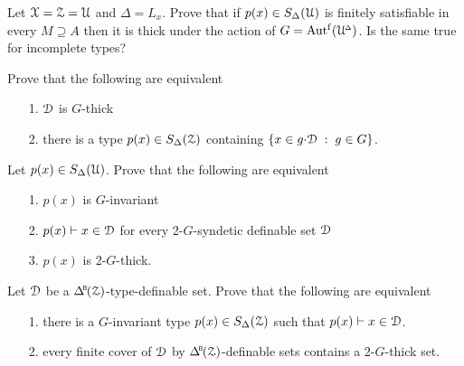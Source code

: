 
\begin{exercise}
  Let $\EuScript X=\EuScript Z=\EuScript U$ and $\Delta=L_x$.
  Prove that if $p(x)\in S_\Delta(\EuScript U)$ is finitely satisfiable in every $M\supseteq A$ then it is thick under the action of $G=\mbox{Aut$^{\rm f}$}(\EuScript U\kern-.2ex^{\scriptscriptstyle\Delta})$.
  Is the same true for incomplete types?
\end{exercise}

\begin{exercise}
  Prove that the following are equivalent
  \begin{itemize}
    \item[1.] $\EuScript D$ is $G$-thick
    \item[2.] there is a type $p(x)\in S_\Delta(\EuScript Z)$ containing $\{x\in g{\cdot}\EuScript D\;:\;g\in G\}$.
  \end{itemize}
\end{exercise}

\begin{exercise}
  Let $p(x)\in S_\Delta(\EuScript U)$.
  Prove that the following are equivalent
  \begin{itemize}
    \item[1.] $p(x)$ is $G$-invariant
    \item[2.] $p(x)\vdash x\in\EuScript D$ for every 2-$G$-syndetic definable set $\EuScript D$
    \item[3.] $p(x)$ is 2-$G$-thick.
  \end{itemize}
\end{exercise}

\begin{exercise}
  Let $\EuScript D$ be a $\BDelta(\Z)$-type-definable set.
  Prove that the following are equivalent 
  \begin{itemize}
    \item[1.] there is a $G$-invariant type $p(x)\in S_\Delta(\EuScript Z)$ such that $p(x)\vdash x\in\EuScript D$.
    \item[2.] every finite cover of $\EuScript D$ by $\BDelta(\Z)$-definable sets contains a 2-$G$-thick set.
  \end{itemize}
\end{exercise}


